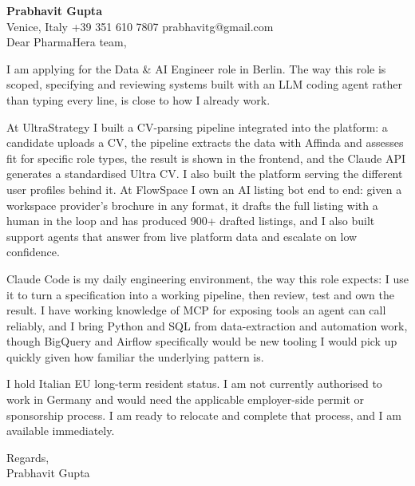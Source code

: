 \documentclass[a4paper,10.5pt]{article}
\begin{document}
\textbf{Prabhavit Gupta}\\
Venice, Italy \textbar{} +39 351 610 7807 \textbar{} prabhavitg@gmail.com\\[10pt]
Dear PharmaHera team,

I am applying for the Data \& AI Engineer role in Berlin. The way this role is scoped, specifying and reviewing systems built with an LLM coding agent rather than typing every line, is close to how I already work.

At UltraStrategy I built a CV-parsing pipeline integrated into the platform: a candidate uploads a CV, the pipeline extracts the data with Affinda and assesses fit for specific role types, the result is shown in the frontend, and the Claude API generates a standardised Ultra CV. I also built the platform serving the different user profiles behind it. At FlowSpace I own an AI listing bot end to end: given a workspace provider's brochure in any format, it drafts the full listing with a human in the loop and has produced 900+ drafted listings, and I also built support agents that answer from live platform data and escalate on low confidence.

Claude Code is my daily engineering environment, the way this role expects: I use it to turn a specification into a working pipeline, then review, test and own the result. I have working knowledge of MCP for exposing tools an agent can call reliably, and I bring Python and SQL from data-extraction and automation work, though BigQuery and Airflow specifically would be new tooling I would pick up quickly given how familiar the underlying pattern is.

I hold Italian EU long-term resident status. I am not currently authorised to work in Germany and would need the applicable employer-side permit or sponsorship process. I am ready to relocate and complete that process, and I am available immediately.

Regards,\\
Prabhavit Gupta
\end{document}
